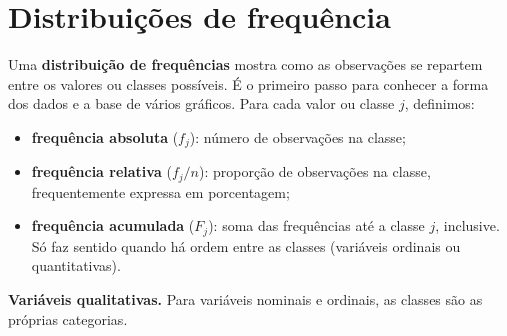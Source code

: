 \documentclass[
]{book}
\newenvironment{Shaded}{\begin{snugshade}}{\end{snugshade}}
\newcommand{\AttributeTok}[1]{\textcolor[rgb]{0.13,0.29,0.53}{#1}}
\newcommand{\ConstantTok}[1]{\textcolor[rgb]{0.56,0.35,0.01}{#1}}
\newcommand{\DecValTok}[1]{\textcolor[rgb]{0.00,0.00,0.81}{#1}}
\newcommand{\FunctionTok}[1]{\textcolor[rgb]{0.13,0.29,0.53}{\textbf{#1}}}
\newcommand{\NormalTok}[1]{#1}
\newcommand{\OtherTok}[1]{\textcolor[rgb]{0.56,0.35,0.01}{#1}}
\newcommand{\SpecialCharTok}[1]{\textcolor[rgb]{0.81,0.36,0.00}{\textbf{#1}}}
\newcommand{\StringTok}[1]{\textcolor[rgb]{0.31,0.60,0.02}{#1}}
\providecommand{\tightlist}{%
  \setlength{\itemsep}{0pt}\setlength{\parskip}{0pt}}
\begin{document}
\section{Distribuições de frequência}\label{distribuiuxe7uxf5es-de-frequuxeancia}

Uma \textbf{distribuição de frequências} mostra como as observações se repartem entre os valores ou classes possíveis. É o primeiro passo para conhecer a forma dos dados e a base de vários gráficos. Para cada valor ou classe \(j\), definimos:

\begin{itemize}
\tightlist
\item
  \textbf{frequência absoluta} (\(f_j\)): número de observações na classe;
\item
  \textbf{frequência relativa} (\(f_j/n\)): proporção de observações na classe, frequentemente expressa em porcentagem;
\item
  \textbf{frequência acumulada} (\(F_j\)): soma das frequências até a classe \(j\), inclusive. Só faz sentido quando há ordem entre as classes (variáveis ordinais ou quantitativas).
\end{itemize}

\textbf{Variáveis qualitativas.} Para variáveis nominais e ordinais, as classes são as próprias categorias.

\begin{Shaded}
\end{Shaded}
\end{document}
